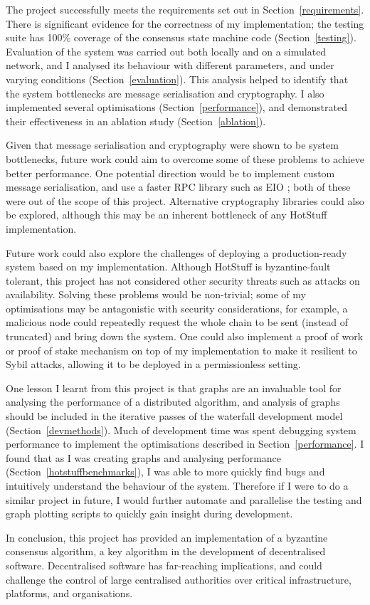 The project successfully meets the requirements set out in Section~\ref{requirements}. There is significant evidence for the correctness of my implementation; the testing suite has 100\% coverage of the consensus state machine code (Section~\ref{testing}). Evaluation of the system was carried out both locally and on a simulated network, and I analysed its behaviour with different parameters, and under varying conditions (Section~\ref{evaluation}). This analysis helped to identify that the system bottlenecks are message serialisation and cryptography. I also implemented several optimisations (Section~\ref{performance}), and demonstrated their effectiveness in an ablation study (Section~\ref{ablation}).

Given that message serialisation and cryptography were shown to be system bottlenecks, future work could aim to overcome some of these problems to achieve better performance. One potential direction would be to implement custom message serialisation, and use a faster RPC library such as EIO \cite{eio}; both of these were out of the scope of this project. Alternative cryptography libraries could also be explored, although this may be an inherent bottleneck of any HotStuff implementation.

Future work could also explore the challenges of deploying a production-ready system based on my implementation. Although HotStuff is byzantine-fault tolerant, this project has not considered other security threats such as attacks on availability. Solving these problems would be non-trivial; some of my optimisations may be antagonistic with security considerations, for example, a malicious node could repeatedly request the whole chain to be sent (instead of truncated) and bring down the system. One could also implement a proof of work or proof of stake mechanism on top of my implementation to make it resilient to Sybil attacks, allowing it to be deployed in a permissionless setting.

One lesson I learnt from this project is that graphs are an invaluable tool for analysing the performance of a distributed algorithm, and analysis of graphs should be included in the iterative passes of the waterfall development model (Section~\ref{devmethods}). Much of development time was spent debugging system performance to implement the optimisations described in Section~\ref{performance}. I found that as I was creating graphs and analysing performance (Section~\ref{hotstuffbenchmarks}), I was able to more quickly find bugs and intuitively understand the behaviour of the system. Therefore if I were to do a similar project in future, I would further automate and parallelise the testing and graph plotting scripts to quickly gain insight during development.

In conclusion, this project has provided an implementation of a byzantine consensus algorithm, a key algorithm in the development of decentralised software. Decentralised software has far-reaching implications, and could challenge the control of large centralised authorities over critical infrastructure, platforms, and organisations.